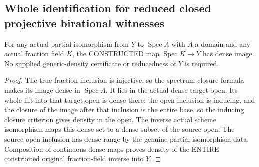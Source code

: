\subsection{Whole identification for reduced closed projective birational witnesses}

\begin{lemma}
\label{scheme:actual-partial-iso-fraction-lift-dense}
For any actual partial isomorphism from $Y$ to $\operatorname{Spec}A$ with
$A$ a domain and any actual fraction field $K$, the CONSTRUCTED map
$\operatorname{Spec}K\to Y$ has dense image. No supplied generic-density
certificate or reducedness of $Y$ is required.
\leanok
\end{lemma}
\begin{proof}
The true fraction inclusion is injective, so the spectrum closure formula
makes its image dense in $\operatorname{Spec}A$. It lies in the actual dense
target open. Its whole lift into that target open is dense there: the open
inclusion is inducing, and the closure of the image after that inclusion is
the entire base, so the inducing closure criterion gives density in the open.
The inverse actual scheme isomorphism maps this dense set to a dense subset
of the source open. The source-open inclusion has dense range by the genuine
partial-isomorphism data. Composition of continuous dense maps proves density
of the ENTIRE constructed original fraction-field inverse into $Y$.
\end{proof}

